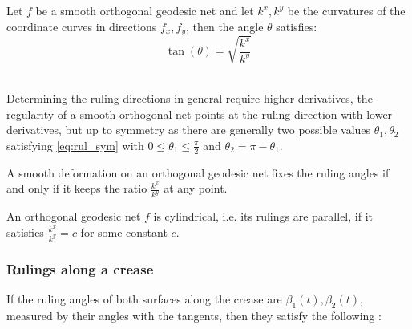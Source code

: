 \begin{theorem}
	\label{Lem:ruling_sym}
	Let $f$ be a smooth orthogonal geodesic net and let $k^x,k^y$ be the curvatures of the coordinate curves in directions $f_x,f_y$, then the angle $\theta$ satisfies:
	\begin{equation}
	\tan(\theta) = \sqrt{\frac{k^x}{k^y}} \label{eq:rul_sym}
	\end{equation}
\end{theorem}
\\
Determining the ruling directions in general require higher derivatives, the regularity of a smooth orthogonal net points at the ruling direction with lower derivatives, but up to symmetry as there are generally two possible values $\theta_1,\theta_2$ satisfying \eqref{eq:rul_sym} with $0 \leq \theta_1 \leq \frac{\pi}{2}$ and $ \theta_2 = \pi -\theta_1$.

\begin{topbot}
\begin{corollary}
\label{cor:cont_orth_geo_dev}
A smooth deformation on an orthogonal geodesic net fixes the ruling angles if and only if it keeps the ratio $\frac{k^x}{k^y}$ at any point.
\end{corollary}
\end{topbot}

\begin{topbot}
\begin{corollary}
\label{cor:cont_orth_geo_dev}
An orthogonal geodesic net $f$ is cylindrical, i.e. its rulings are parallel, if it satisfies $\frac{k^x}{k^y} = c$ for some constant $c$.
\end{corollary}
\end{topbot}


\subsubsection{Rulings along a crease} \label{sec:rulings_crease}
If the ruling angles of both surfaces along the crease are $\beta_1(t),\beta_2(t)$, measured by their angles with the tangents, then they satisfy the following \cite{more_on_paper,duncan_folded}:

